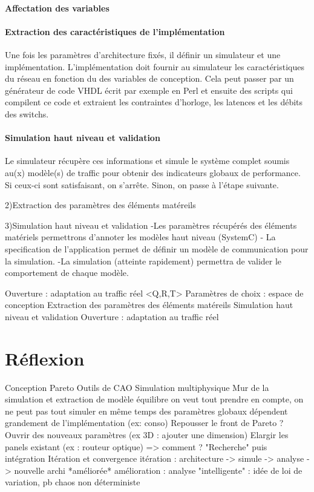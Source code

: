 \documentclass[11pt]{article}
\begin{document}
\paragraph{Affectation des variables}

\paragraph{Extraction des caractéristiques de l'implémentation}
Une fois les paramètres d'architecture fixés, il définir un simulateur et une implémentation. L'implémentation doit fournir au simulateur les caractéristiques du réseau en fonction du des variables de conception. Cela peut passer par un générateur de code VHDL écrit par exemple en Perl et ensuite des scripts qui compilent ce code et extraient les contraintes d'horloge, les latences et les débits des switchs.

\paragraph{Simulation haut niveau et validation}
Le simulateur récupère ces informations et simule le système complet soumis au(x) modèle(s) de traffic pour obtenir des indicateurs globaux de performance. Si ceux-ci sont satisfaisant, on s'arrête. Sinon, on passe à l'étape suivante.

	

    2)Extraction des paramètres des éléments matéreils

    3)Simulation haut niveau et validation
	-Les paramètres récupérés des éléments matériels permettrons d'annoter les modèles haut niveau (SystemC)
	- La specification de l'application permet de définir un modèle de communication pour la simulation.
	-La simulation (atteinte rapidement) permettra de valider le comportement de chaque modèle. 
	

    Ouverture : adaptation au traffic réel
	<Q,R,T>
	Paramètres de choix : espace de conception
	Extraction des paramètres des éléments matéreils
	Simulation haut niveau et validation
	Ouverture : adaptation au traffic réel

\section{Réflexion}
	Conception
	Pareto
	Outils de CAO
	Simulation multiphysique
	Mur de la simulation et extraction de modèle
		équilibre on veut tout prendre en compte, on ne peut pas tout simuler en même temps
		des paramètres globaux dépendent grandement de l'implémentation (ex: conso)
	Repousser le front de Pareto ?
		Ouvrir des nouveaux paramètres (ex 3D : ajouter une dimension)
		Elargir les panels existant (ex : routeur optique)
		=> comment ? "Recherche" puis intégration
	Itération et convergence
		itération : architecture -> simule -> analyse -> nouvelle archi *améliorée*
		amélioration : analyse "intelligente" : idée de loi de variation, pb chaos non déterministe
\end{document}
